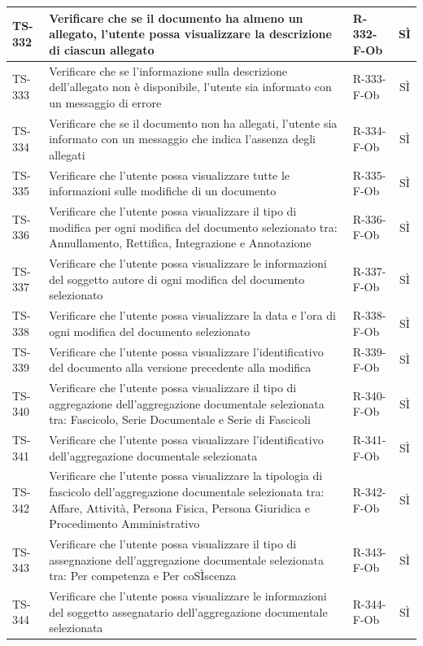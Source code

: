 \documentclass[a4paper,12pt]{article}
\begin{document}
\begin{longtable}{|p{1.5cm}|p{8.3cm}|p{2.4cm}|c|}
\hline
TS-332 & Verificare che se il documento ha almeno un allegato, l'utente possa visualizzare la descrizione di ciascun allegato & R-332-F-Ob & SÌ \\
\hline
TS-333 & Verificare che se l'informazione sulla descrizione dell'allegato non è disponibile, l'utente sia informato con un messaggio di errore & R-333-F-Ob & SÌ \\
\hline
TS-334 & Verificare che se il documento non ha allegati, l'utente sia informato con un messaggio che indica l'assenza degli allegati & R-334-F-Ob & SÌ \\
\hline
TS-335 & Verificare che l'utente possa visualizzare tutte le informazioni sulle modifiche di un documento & R-335-F-Ob & SÌ \\
\hline
TS-336 & Verificare che l'utente possa visualizzare il tipo di modifica per ogni modifica del documento selezionato tra: Annullamento, Rettifica, Integrazione e Annotazione & R-336-F-Ob & SÌ \\
\hline
TS-337 & Verificare che l'utente possa visualizzare le informazioni del soggetto autore di ogni modifica del documento selezionato & R-337-F-Ob & SÌ \\
\hline
TS-338 & Verificare che l'utente possa visualizzare la data e l'ora di ogni modifica del documento selezionato & R-338-F-Ob & SÌ \\
\hline
TS-339 & Verificare che l'utente possa visualizzare l'identificativo del documento alla versione precedente alla modifica & R-339-F-Ob & SÌ \\
\hline
TS-340 & Verificare che l'utente possa visualizzare il tipo di aggregazione dell'aggregazione documentale selezionata tra: Fascicolo, Serie Documentale e Serie di Fascicoli & R-340-F-Ob & SÌ \\
\hline
TS-341 & Verificare che l'utente possa visualizzare l'identificativo dell'aggregazione documentale selezionata & R-341-F-Ob & SÌ \\
\hline
TS-342 & Verificare che l'utente possa visualizzare la tipologia di fascicolo dell'aggregazione documentale selezionata tra: Affare, Attività, Persona Fisica, Persona Giuridica e Procedimento Amministrativo & R-342-F-Ob & SÌ \\
\hline
TS-343 & Verificare che l'utente possa visualizzare il tipo di assegnazione dell'aggregazione documentale selezionata tra: Per competenza e Per coSÌscenza & R-343-F-Ob & SÌ \\
\hline
TS-344 & Verificare che l'utente possa visualizzare le informazioni del soggetto assegnatario dell'aggregazione documentale selezionata & R-344-F-Ob & SÌ \\

\end{longtable}
\end{document}
